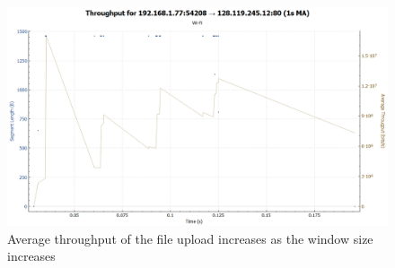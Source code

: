 \documentclass[10pt]{IEEEtran}
\begin{document}
\begin{appendix}
\begin{figure}[h!]
 \includegraphics[width=\linewidth]{tcpthroughput.png}
 	\caption{Average throughput of the file upload increases as the window size increases}
    \end{figure}

\end{appendix}
\end{document}
